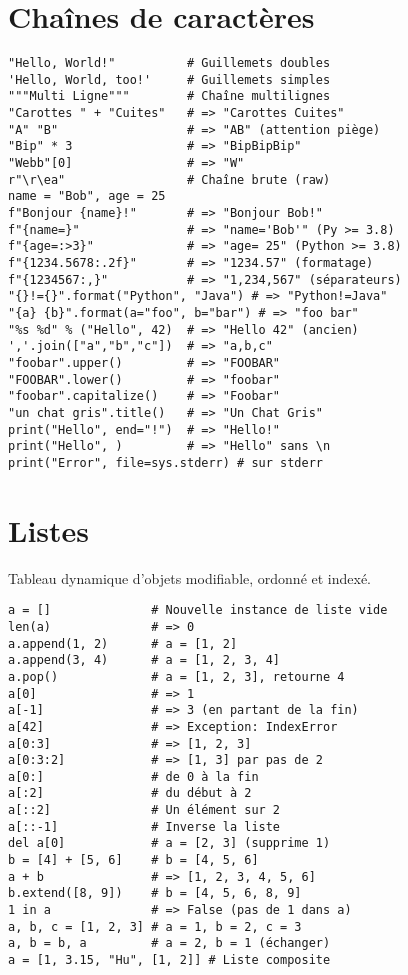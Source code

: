 \documentclass{article}
\begin{document}
\begin{multicols*}{4}
\section*{Chaînes de caractères}

\begin{lstlisting}
"Hello, World!"          # Guillemets doubles
'Hello, World, too!'     # Guillemets simples
"""Multi Ligne"""        # Chaîne multilignes
"Carottes " + "Cuites"   # => "Carottes Cuites"
"A" "B"                  # => "AB" (attention piège)
"Bip" * 3                # => "BipBipBip"
"Webb"[0]                # => "W"
r"\r\ea"                 # Chaîne brute (raw)
name = "Bob", age = 25
f"Bonjour {name}!"       # => "Bonjour Bob!"
f"{name=}"               # => "name='Bob'" (Py >= 3.8)
f"{age=:>3}"             # => "age= 25" (Python >= 3.8)
f"{1234.5678:.2f}"       # => "1234.57" (formatage)
f"{1234567:,}"           # => "1,234,567" (séparateurs)
"{}!={}".format("Python", "Java") # => "Python!=Java"
"{a} {b}".format(a="foo", b="bar") # => "foo bar"
"%s %d" % ("Hello", 42)  # => "Hello 42" (ancien)
','.join(["a","b","c"])  # => "a,b,c"
"foobar".upper()         # => "FOOBAR"
"FOOBAR".lower()         # => "foobar"
"foobar".capitalize()    # => "Foobar"
"un chat gris".title()   # => "Un Chat Gris"
print("Hello", end="!")  # => "Hello!"
print("Hello", )         # => "Hello" sans \n
print("Error", file=sys.stderr) # sur stderr
\end{lstlisting}

\section*{Listes}
Tableau dynamique d'objets modifiable, ordonné et indexé.
\begin{lstlisting}
a = []              # Nouvelle instance de liste vide
len(a)              # => 0
a.append(1, 2)      # a = [1, 2]
a.append(3, 4)      # a = [1, 2, 3, 4]
a.pop()             # a = [1, 2, 3], retourne 4
a[0]                # => 1
a[-1]               # => 3 (en partant de la fin)
a[42]               # => Exception: IndexError
a[0:3]              # => [1, 2, 3]
a[0:3:2]            # => [1, 3] par pas de 2
a[0:]               # de 0 à la fin
a[:2]               # du début à 2
a[::2]              # Un élément sur 2
a[::-1]             # Inverse la liste
del a[0]            # a = [2, 3] (supprime 1)
b = [4] + [5, 6]    # b = [4, 5, 6]
a + b               # => [1, 2, 3, 4, 5, 6]
b.extend([8, 9])    # b = [4, 5, 6, 8, 9]
1 in a              # => False (pas de 1 dans a)
a, b, c = [1, 2, 3] # a = 1, b = 2, c = 3
a, b = b, a         # a = 2, b = 1 (échanger)
a = [1, 3.15, "Hu", [1, 2]] # Liste composite
\end{lstlisting}


\end{multicols*}
\end{document}
